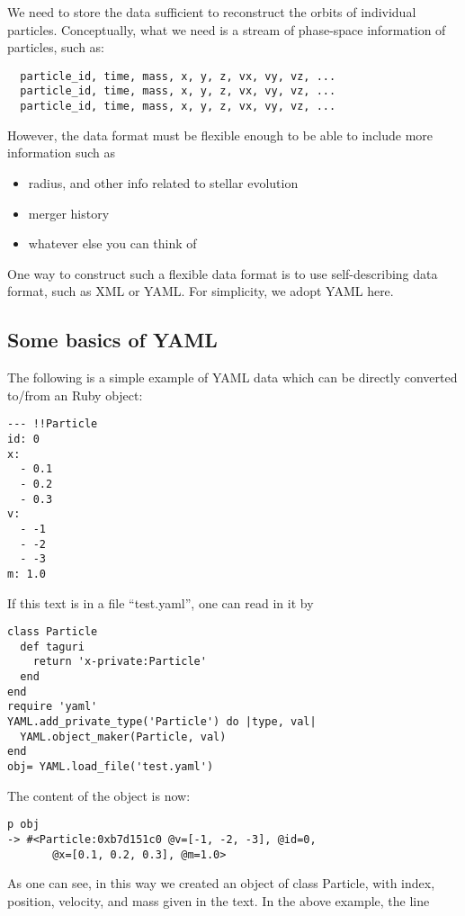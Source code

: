 \documentclass[12pt]{article}
\begin{document}
We need to store the data sufficient to reconstruct the orbits of
individual particles. Conceptually, what we need is a stream of
phase-space information of particles, such as:
\begin{verbatim}
  particle_id, time, mass, x, y, z, vx, vy, vz, ...
  particle_id, time, mass, x, y, z, vx, vy, vz, ...
  particle_id, time, mass, x, y, z, vx, vy, vz, ...
\end{verbatim}
However, the data format must be flexible enough to be able to include
more information such as
\begin{itemize}
  \item radius, and other info related to stellar evolution
  \item merger history
  \item whatever else you can think of
\end{itemize}

One way to construct such a flexible data format is to use
self-describing data format, such as XML or YAML. For simplicity,
we adopt YAML here.

\subsection{Some basics of YAML}

The following is a simple example of YAML data which can be directly
converted to/from an Ruby object:

\begin{verbatim}
--- !!Particle
id: 0
x:
  - 0.1
  - 0.2
  - 0.3
v:
  - -1
  - -2
  - -3
m: 1.0
\end{verbatim}

If this text is in a file ``test.yaml'', one can read in it by

\begin{verbatim}
class Particle
  def taguri
    return 'x-private:Particle'
  end
end
require 'yaml'
YAML.add_private_type('Particle') do |type, val|
  YAML.object_maker(Particle, val)
end
obj= YAML.load_file('test.yaml')
\end{verbatim}

The content of the object is now:
\begin{verbatim}
p obj
-> #<Particle:0xb7d151c0 @v=[-1, -2, -3], @id=0,
       @x=[0.1, 0.2, 0.3], @m=1.0>
\end{verbatim}

As one can see, in this way we created an object of class Particle,
with index, position, velocity, and mass given in the text. In the
above example, the line
\end{document}
